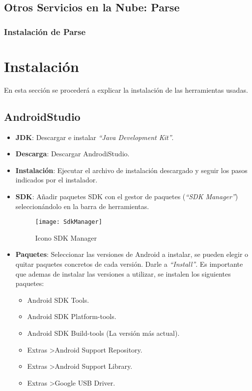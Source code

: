 	\subsection{Otros Servicios en la Nube: Parse}
	
	\subsubsection{Instalación de Parse}
	
\section{Instalación}

	En esta sección se procederá a explicar la instalación de las herramientas usadas.

	\subsection{AndroidStudio}
		\begin{itemize}
			\item {\bf JDK}: Descargar e instalar {\it ``Java Development Kit''}\cite{17:jdk:online}.
			\item {\bf Descarga}: Descargar AndrodiStudio\cite{13:androidstudiodescarga:online}.
			\item {\bf Instalación}: Ejecutar el archivo de instalación descargado y seguir los pasos indicados por el instalador.
			\item {\bf SDK}: Añadir paquetes SDK con el gestor de paquetes ({\em ``SDK Manager''}) seleccionándolo en la barra de herramientas.
				\begin{figure}[h]
					\centering
					\texttt{[image: SdkManager]}
					\caption{Icono SDK Manager}
					\label{fig:SdkManager}
				\end{figure}
			\item {\bf Paquetes}: Seleccionar las versiones de Android\cite{2:android:online} a instalar, se pueden elegir o quitar paquetes concretos de cada versión. Darle a {\em ``Install''}. Es importante que ademas de instalar las versiones a utilizar, se instalen los siguientes paquetes:
				\begin{itemize}
					\item Android SDK Tools.
					\item Android SDK Platform-tools.
					\item Android SDK Build-tools (La versión más actual).
					\item Extras \textgreater Android Support Repository.
					\item Extras \textgreater Android Support Library.
					\item Extras \textgreater Google USB Driver.
				\end{itemize}
		\end{itemize}
		
